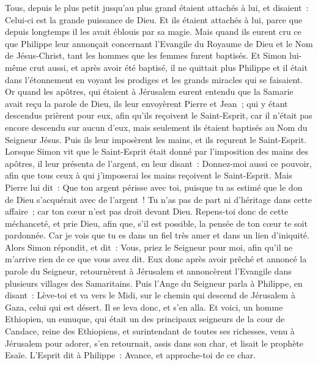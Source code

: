 \begin{multicols}{2}
Tous, depuis le plus petit jusqu'au plus grand étaient attachés à lui, et disaient~: Celui-ci est la grande puissance de Dieu.
Et ils étaient attachés à lui, parce que depuis longtemps il les avait éblouis par sa magie.
Mais quand ils eurent cru ce que Philippe leur annonçait concernant l'Evangile du Royaume de Dieu et le Nom de Jésus-Christ, tant les hommes que les femmes furent baptisés.
Et Simon lui-même crut aussi, et après avoir été baptisé, il ne quittait plus Philippe et il était dans l'étonnement en voyant les prodiges et les grands miracles qui se faisaient.
Or quand les apôtres, qui étaient à Jérusalem eurent entendu que la Samarie avait reçu la parole de Dieu, ils leur envoyèrent Pierre et Jean~;
qui y étant descendus prièrent pour eux, afin qu'ils reçoivent le Saint-Esprit,
car il n'était pas encore descendu sur aucun d'eux, mais seulement ils étaient baptisés au Nom du Seigneur Jésus.
Puis ils leur imposèrent les mains, et ils reçurent le Saint-Esprit.
Lorsque Simon vit que le Saint-Esprit était donné par l'imposition des mains des apôtres, il leur présenta de l'argent,
en leur disant~: Donnez-moi aussi ce pouvoir, afin que tous ceux à qui j'imposerai les mains reçoivent le Saint-Esprit.
Mais Pierre lui dit~: Que ton argent périsse avec toi, puisque tu as estimé que le don de Dieu s'acquérait avec de l'argent~!
Tu n'as pas de part ni d'héritage dans cette affaire~; car ton cœur n'est pas droit devant Dieu.
Repens-toi donc de cette méchanceté, et prie Dieu, afin que, s'il est possible, la pensée de ton cœur te soit pardonnée.
Car je vois que tu es dans un fiel très amer et dans un lien d'iniquité.
Alors Simon répondit, et dit~: Vous, priez le Seigneur pour moi, afin qu'il ne m'arrive rien de ce que vous avez dit.
Eux donc après avoir prêché et annoncé la parole du Seigneur, retournèrent à Jérusalem et annoncèrent l'Evangile dans plusieurs villages des Samaritains.
Puis l'Ange du Seigneur parla à Philippe, en disant~: Lève-toi et va vers le Midi, sur le chemin qui descend de Jérusalem à Gaza, celui qui est désert.
Il se leva donc, et s'en alla. Et voici, un homme Ethiopien, un eunuque, qui était un des principaux seigneurs de la cour de Candace, reine des Ethiopiens, et surintendant de toutes ses richesses, venu à Jérusalem pour adorer,
s'en retournait, assis dans son char, et lisait le prophète Esaïe.
L'Esprit dit à Philippe~: Avance, et approche-toi de ce char.

\end{multicols}
